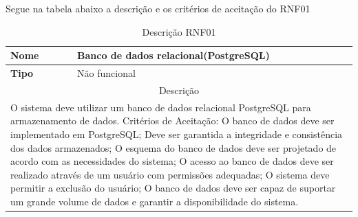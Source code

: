 \clearpage
Segue na tabela abaixo a descrição e os critérios de aceitação do RNF01
\begin{table}[htb]
	\centering
	\caption{\label{Formatação do texto.}Descrição RNF01}	
	\begin{tabular}{|l|p{11cm}|}
		\hline
		\textbf{Nome}    & Banco de dados relacional(PostgreSQL)\\ \hline
		\textbf{Tipo}    & Não funcional\\ \hline
		\multicolumn{2}{|c|}{Descrição}\\ \hline
		\multicolumn{2}{|p{12cm}|}{
			O sistema deve utilizar um banco de dados relacional PostgreSQL para armazenamento de dados. \newline
			\newline Critérios de Aceitação: \newline
			O banco de dados deve ser implementado em PostgreSQL;
			Deve ser garantida a integridade e consistência dos dados armazenados;\newline
			\newline O esquema do banco de dados deve ser projetado de acordo com as necessidades do sistema; \newline
			\newline O acesso ao banco de dados deve ser realizado através de um usuário com permissões adequadas; \newline
			\newline O sistema deve permitir a exclusão do usuário; \newline
			O banco de dados deve ser capaz de suportar um grande volume de dados e garantir a disponibilidade do sistema.
			} \\ \hline
	\end{tabular}
\end{table}

